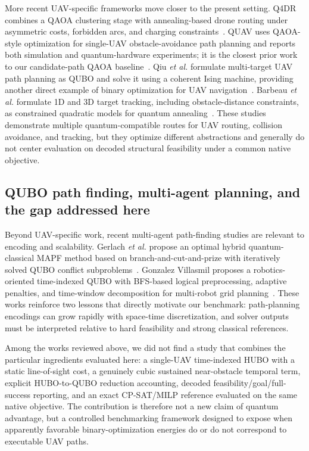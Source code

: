 \documentclass[10pt,conference]{IEEEtran}
\begin{document}
More recent UAV-specific frameworks move closer to the present setting. Q4DR combines a QAOA clustering stage with annealing-based drone routing under asymmetric costs, forbidden arcs, and charging constraints~\cite{osaba2025q4dr}. QUAV uses QAOA-style optimization for single-UAV obstacle-avoidance path planning and reports both simulation and quantum-hardware experiments; it is the closest prior work to our candidate-path QAOA baseline~\cite{innan2025quav}. Qiu \emph{et al.} formulate multi-target UAV path planning as QUBO and solve it using a coherent Ising machine, providing another direct example of binary optimization for UAV navigation~\cite{qiu2025}. Barbeau \emph{et al.} formulate 1D and 3D target tracking, including obstacle-distance constraints, as constrained quadratic models for quantum annealing~\cite{barbeau2025}. These studies demonstrate multiple quantum-compatible routes for UAV routing, collision avoidance, and tracking, but they optimize different abstractions and generally do not center evaluation on decoded structural feasibility under a common native objective.

\subsection{QUBO path finding, multi-agent planning, and the gap addressed here}
Beyond UAV-specific work, recent multi-agent path-finding studies are relevant to encoding and scalability. Gerlach \emph{et al.} propose an optimal hybrid quantum-classical MAPF method based on branch-and-cut-and-prize with iteratively solved QUBO conflict subproblems~\cite{gerlach2025}. Gonzalez Villasmil proposes a robotics-oriented time-indexed QUBO with BFS-based logical preprocessing, adaptive penalties, and time-window decomposition for multi-robot grid planning~\cite{villasmil2026}. These works reinforce two lessons that directly motivate our benchmark: path-planning encodings can grow rapidly with space-time discretization, and solver outputs must be interpreted relative to hard feasibility and strong classical references.

Among the works reviewed above, we did not find a study that combines the particular ingredients evaluated here: a single-UAV time-indexed HUBO with a static line-of-sight cost, a genuinely cubic sustained near-obstacle temporal term, explicit HUBO-to-QUBO reduction accounting, decoded feasibility/goal/full-success reporting, and an exact CP-SAT/MILP reference evaluated on the same native objective. The contribution is therefore not a new claim of quantum advantage, but a controlled benchmarking framework designed to expose when apparently favorable binary-optimization energies do or do not correspond to executable UAV paths.
\end{document}
